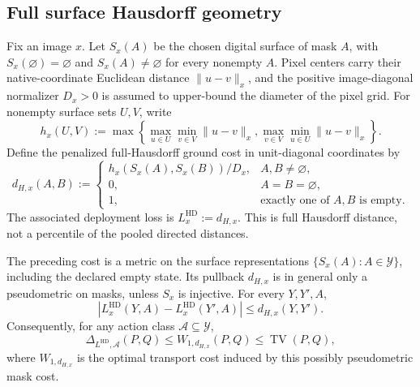 \subsection{Full surface Hausdorff geometry}

Fix an image $x$. Let $S_x(A)$ be the chosen digital surface of mask $A$, with
$S_x(\varnothing)=\varnothing$ and $S_x(A)\neq\varnothing$ for every nonempty
$A$. Pixel centers carry their native-coordinate Euclidean distance
$\|u-v\|_x$, and
the positive image-diagonal normalizer $D_x>0$ is assumed to upper-bound the diameter of
the pixel grid. For nonempty surface sets $U,V$, write
\begin{equation*}
  h_x(U,V):=\max\!\left\{
    \max_{u\in U}\min_{v\in V}\|u-v\|_x,
    \max_{v\in V}\min_{u\in U}\|u-v\|_x
  \right\}.
\end{equation*}
Define the penalized full-Hausdorff ground cost in unit-diagonal coordinates by
\begin{equation*}
  d_{H,x}(A,B):=
  \begin{cases}
    h_x(S_x(A),S_x(B))/D_x,&A,B\neq\varnothing,\\
    0,&A=B=\varnothing,\\
    1,&\text{exactly one of $A,B$ is empty}.
  \end{cases}
\end{equation*}
The associated deployment loss is $L_x^{\mathrm{HD}}:=d_{H,x}$. This is full
Hausdorff distance, not a percentile of the pooled directed distances.

\begin{lemma}
\label{app:lem:full-hd-wasserstein}
The preceding cost is a metric on the surface representations
$\{S_x(A):A\in\mathcal Y\}$, including the declared empty state. Its pullback
$d_{H,x}$ is in general only a pseudometric on masks, unless $S_x$ is injective.
For every $Y,Y',A$,
\begin{equation*}
  |L_x^{\mathrm{HD}}(Y,A)-L_x^{\mathrm{HD}}(Y',A)|
  \leq d_{H,x}(Y,Y').
\end{equation*}
Consequently, for any action class $\mathcal A\subseteq\mathcal Y$,
\begin{equation*}
  \Delta_{L^{\mathrm{HD}},\mathcal A}(P,Q)
  \leq W_{1,d_{H,x}}(P,Q)
  \leq\operatorname{TV}(P,Q),
\end{equation*}
where $W_{1,d_{H,x}}$ is the optimal transport cost induced by this possibly
pseudometric mask cost.
\end{lemma}


